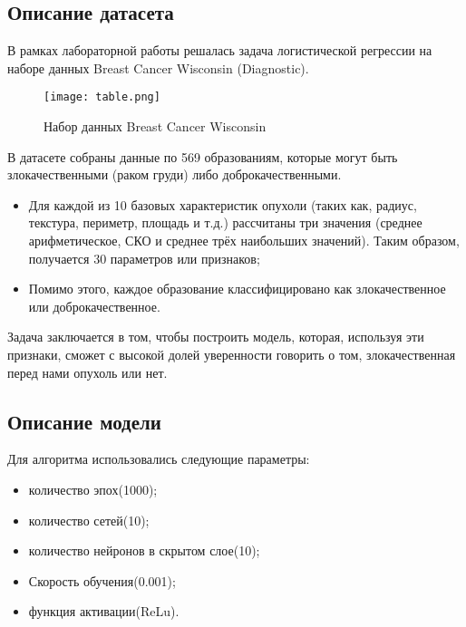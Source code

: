 \documentclass[12pt]{extarticle}
\begin{document}
\subsection{Описание датасета}

В рамках лабораторной работы решалась задача логистической регрессии на наборе данных Breast Cancer Wisconsin (Diagnostic).

\begin{figure}[H]
    \centering
    \texttt{[image: table.png]} %
    \caption{Набор данных Breast Cancer Wisconsin}
    \label{fig:example}
\end{figure}

\FloatBarrier %

В датасете собраны данные по 569 образованиям, которые могут быть злокачественными (раком груди) либо доброкачественными.
\begin{itemize}
    \item Для каждой из 10 базовых характеристик опухоли (таких как, радиус, текстура, периметр, площадь и т.д.) рассчитаны три значения (среднее арифметическое, СКО и среднее трёх наибольших значений). Таким образом, получается 30 параметров или признаков;
    \item Помимо этого, каждое образование классифицировано как злокачественное или доброкачественное.
\end{itemize}

Задача заключается в том, чтобы построить модель, которая, используя эти признаки, сможет с высокой долей уверенности говорить о том, злокачественная перед нами опухоль или нет.

\subsection{Описание модели}
Для алгоритма использовались следующие параметры:

\begin{itemize}
    \item количество эпох(1000);
    \item количество сетей(10);
    \item количество нейронов в скрытом слое(10);
    \item Скорость обучения(0.001);
    \item функция активации(ReLu).
\end{itemize}
\end{document}
